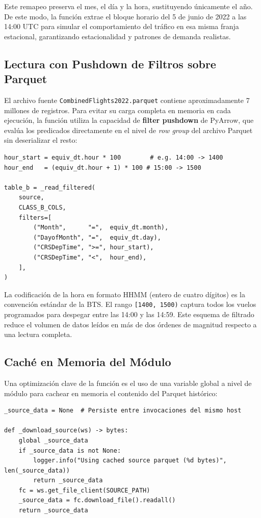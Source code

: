 \documentclass[12pt,oneside,a4paper]{report}
\renewcommand{\_}{\textunderscore\allowbreak}
\begin{document}
Este remapeo preserva el mes, el día y la hora, sustituyendo únicamente el año. De este modo, la función extrae el bloque horario del 5 de junio de 2022 a las 14:00 UTC para simular el comportamiento del tráfico en esa misma franja estacional, garantizando estacionalidad y patrones de demanda realistas.

\subsection{Lectura con Pushdown de Filtros sobre Parquet}
\label{sub:pushdown_parquet}

El archivo fuente \texttt{Combined\_Flights\_2022.parquet} contiene aproximadamente 7 millones de registros. Para evitar su carga completa en memoria en cada ejecución, la función utiliza la capacidad de \textbf{filter pushdown} de PyArrow, que evalúa los predicados directamente en el nivel de \textit{row group} del archivo Parquet sin deserializar el resto:

\begin{lstlisting}[style=pystyle, caption={Filtrado eficiente con pushdown en PyArrow para aislar un bloque horario.}]
hour_start = equiv_dt.hour * 100        # e.g. 14:00 -> 1400
hour_end   = (equiv_dt.hour + 1) * 100 # 15:00 -> 1500

table_b = _read_filtered(
    source,
    CLASS_B_COLS,
    filters=[
        ("Month",      "=",  equiv_dt.month),
        ("DayofMonth", "=",  equiv_dt.day),
        ("CRSDepTime", ">=", hour_start),
        ("CRSDepTime", "<",  hour_end),
    ],
)
\end{lstlisting}

La codificación de la hora en formato HHMM (entero de cuatro dígitos) es la convención estándar de la BTS. El rango \texttt{[1400, 1500)} captura todos los vuelos programados para despegar entre las 14:00 y las 14:59. Este esquema de filtrado reduce el volumen de datos leídos en más de dos órdenes de magnitud respecto a una lectura completa.

\subsection{Caché en Memoria del Módulo}
\label{sub:cache_modulo}

Una optimización clave de la función es el uso de una variable global a nivel de módulo para cachear en memoria el contenido del Parquet histórico:

\begin{lstlisting}[style=pystyle, caption={Caché de nivel de módulo para el Parquet histórico.}]
_source_data = None  # Persiste entre invocaciones del mismo host

def _download_source(ws) -> bytes:
    global _source_data
    if _source_data is not None:
        logger.info("Using cached source parquet (%d bytes)", len(_source_data))
        return _source_data
    fc = ws.get_file_client(SOURCE_PATH)
    _source_data = fc.download_file().readall()
    return _source_data
\end{lstlisting}
\end{document}
